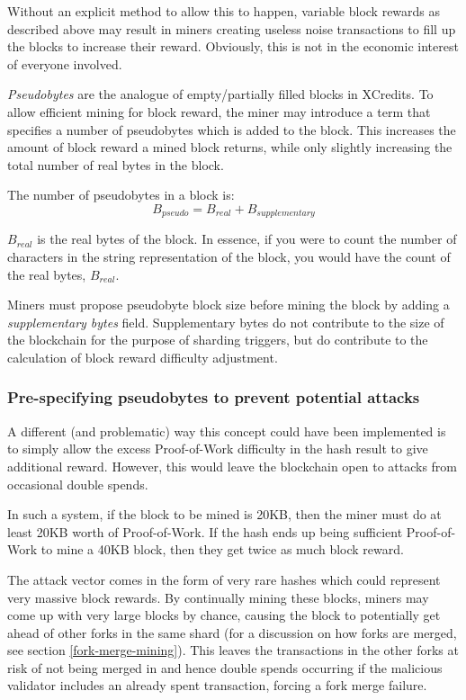 \documentclass[a4paper,12pt]{article}
\begin{document}
Without an explicit method to allow this to happen, variable block rewards as described above may result in miners creating useless noise transactions to fill up the blocks to increase their reward. Obviously, this is not in the economic interest of everyone involved.

\textit{Pseudobytes} are the analogue of empty/partially filled blocks in XCredits. To allow efficient mining for block reward, the miner may introduce a term that specifies a number of pseudobytes which is added to the block. This increases the amount of block reward a mined block returns, while only slightly increasing the total number of real bytes in the block. 

The number of pseudobytes in a block is:
\[B_{pseudo} = B_{real} + B_{supplementary}\]

$B_{real}$ is the real bytes of the block. In essence, if you were to count the number of characters in the string representation of the block, you would have the count of the real bytes, $B_{real}$. 

Miners must propose pseudobyte block size before mining the block by adding a \textit{supplementary bytes} field. Supplementary bytes do not contribute to the size of the blockchain for the purpose of sharding triggers, but do contribute to the calculation of block reward difficulty adjustment.

\subsubsection{Pre-specifying pseudobytes to prevent potential attacks}
A different (and problematic) way this concept could have been implemented is to simply allow the excess Proof-of-Work difficulty in the hash result to give additional reward. However, this would leave the blockchain open to attacks from occasional double spends.

In such a system, if the block to be mined is 20KB, then the miner must do at least 20KB worth of Proof-of-Work. If the hash ends up being sufficient Proof-of-Work to mine a 40KB block, then they get twice as much block reward.

The attack vector comes in the form of very rare hashes which could represent very massive block rewards. By continually mining these blocks, miners may come up with very large blocks by chance, causing the block to potentially get ahead of other forks in the same shard (for a discussion on how forks are merged, see section \ref{fork-merge-mining}). This leaves the transactions in the other forks at risk of not being merged in and hence double spends occurring if the malicious validator includes an already spent transaction, forcing a fork merge failure.
\end{document}
